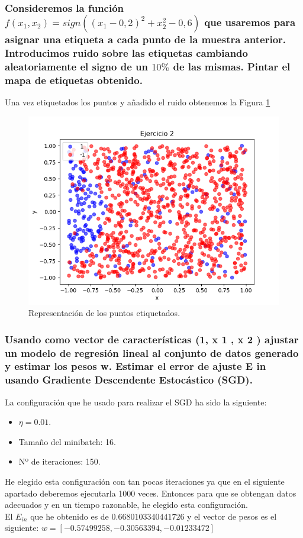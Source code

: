 \documentclass[12pt,a4paper]{article}
\begin{document}
\subsubsection{Consideremos la función $f(x_1,x_2) = sign((x_1-0,2)^2 + x^{2}_2 - 0,6)$ que usaremos para asignar una etiqueta a cada punto de la muestra anterior. Introducimos 	ruido sobre las etiquetas cambiando aleatoriamente el signo de un $10\%$ de las mismas. Pintar el mapa de etiquetas obtenido.}
Una vez etiquetados los puntos y añadido el ruido obtenemos la Figura \ref{pic:ruido}
\begin{figure}[H]  %
	
	\centering
	\includegraphics[width=0.7\textheight]{images/puntosConRuido.png}  %
	\caption{Representación de los puntos etiquetados.}
	\label{pic:ruido}
\end{figure}
\subsubsection{Usando como vector de características (1, x 1 , x 2 ) ajustar un modelo de regresión 	lineal al conjunto de datos generado y estimar los pesos w. Estimar el error de 	ajuste E in usando Gradiente Descendente Estocástico (SGD).}
La configuración que he usado para realizar el SGD ha sido la siguiente:
\begin{itemize}
	\item $\eta=0.01$.
	\item Tamaño del minibatch: 16.
	\item Nº de iteraciones: 150. 
\end{itemize}
He elegido esta configuración con tan pocas iteraciones ya que en el siguiente apartado deberemos ejecutarla 1000 veces. Entonces para que se obtengan datos adecuados y en un tiempo razonable, he elegido esta configuración.\\
El $E_{in}$ que he obtenido es de $0.6680103340441726$ y el vector de pesos es el siguiente: $w = [-0.57499258, -0.30563394, -0.01233472]$
\end{document}
